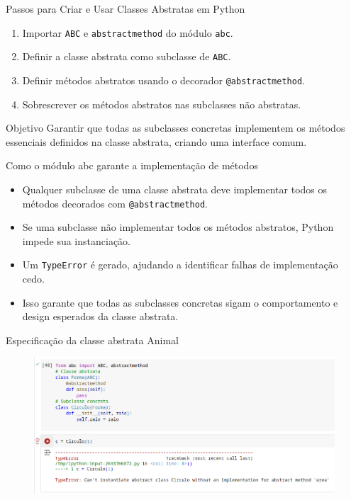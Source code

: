 \begin{frame}{Passos para Criar e Usar Classes Abstratas em Python}

\begin{enumerate}
    \item Importar \texttt{ABC} e \texttt{abstractmethod} do módulo \texttt{abc}.
    \item Definir a classe abstrata como subclasse de \texttt{ABC}.
    \item Definir métodos abstratos usando o decorador \texttt{@abstractmethod}.
    \item Sobrescrever os métodos abstratos nas subclasses não abstratas.
\end{enumerate}

\begin{block}{Objetivo}
Garantir que todas as subclasses concretas implementem os métodos essenciais definidos na classe abstrata, criando uma interface comum.
\end{block}

\end{frame}

\begin{frame}{Como o módulo abc garante a implementação de métodos}
\begin{itemize}
    \item Qualquer subclasse de uma classe abstrata deve implementar todos os métodos decorados com \texttt{@abstractmethod}.
    \item Se uma subclasse não implementar todos os métodos abstratos, Python impede sua instanciação.
    \item Um \texttt{TypeError} é gerado, ajudando a identificar falhas de implementação cedo.
    \item Isso garante que todas as subclasses concretas sigam o comportamento e design esperados da classe abstrata.
\end{itemize}
\end{frame}

\begin{frame}{Especificação da classe abstrata Animal}
    \begin{figure}
        \centering
        \includegraphics[width=\linewidth]{Images/classe-abstrata-erro.png}

        \label{fig:placeholder}
    \end{figure}
\end{frame}


